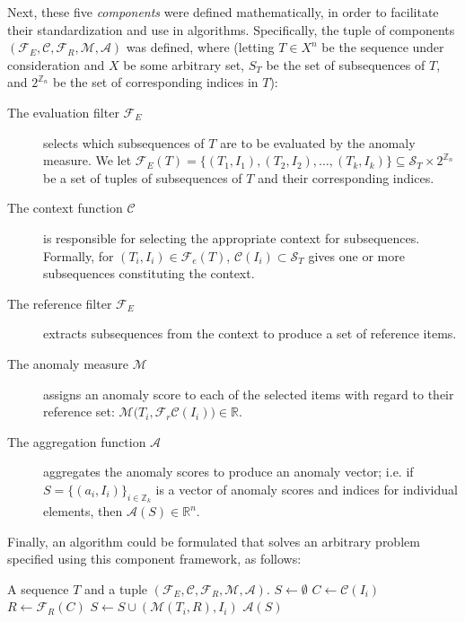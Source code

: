 Next, these five \emph{components} were defined mathematically, in order to facilitate their standardization and use in algorithms. Specifically, the tuple of components $(\mathcal{F}_E, \mathcal{C}, \mathcal{F}_R, \mathcal{M},\mathcal{A})$ was defined, where (letting $T \in X^n$ be the sequence under consideration and $X$ be some arbitrary set, $S_T$ be the set of subsequences of $T$, and $2^{\mathbb{Z}_n}$ be the set of corresponding indices in $T$):
\begin{description}
   \item[The evaluation filter $\mathcal{F}_E$] selects which subsequences of $T$ are to be evaluated by the anomaly measure. We let $\mathcal{F}_E(T) = \{(T_1, I_1), (T_2, I_2), \dots, (T_k, I_k)\} \subseteq \mathcal{S}_T \times 2^{\mathbb{Z}_n}$ be a set of tuples of subsequences of $T$ and their corresponding indices.
   \item[The context function $\mathcal{C}$] is responsible for selecting the appropriate context for subsequences. Formally, for $(T_i, I_i) \in \mathcal{F}_e(T)$, $\mathcal{C}(I_i) \subset \mathcal{S}_T$ gives one or more subsequences constituting the context.
   \item[The reference filter $\mathcal{F}_E$] extracts subsequences from the context to produce a set of reference items.
   \item[The anomaly measure $\mathcal{M}$] assigns an anomaly score to each of the selected items with regard to their reference set: $\mathcal{M}(T_i, \mathcal{F}_r{\mathcal{C}(I_i))} \in \mathbb{R}$.
   \item[The aggregation function $\mathcal{A}$] aggregates the anomaly scores to produce an anomaly vector; i.e. if $S = \{(a_i, I_i)\}_{i \in \mathbb{Z}_k}$ is a vector of anomaly scores and indices for individual elements, then $\mathcal{A}(S) \in \mathbb{R}^{n}$.
\end{description}

Finally, an algorithm could be formulated that solves an arbitrary problem specified using this component framework, as follows:
\begin{algorithmic}
\Require A sequence $T$ and a tuple $(\mathcal{F}_E, \mathcal{C}, \mathcal{F}_R, \mathcal{M}, \mathcal{A}).$
\State $S \gets \emptyset$ 
 
    \State $C \gets \mathcal{C}(I_i)$ 
    \State $R \gets \mathcal{F}_R(C)$ 
    \State $S \gets S \cup (\mathcal{M}(T_i, R), I_i)$ 
\EndFor
\State \Return $\mathcal{A}(S)$ 
\end{algorithmic}


